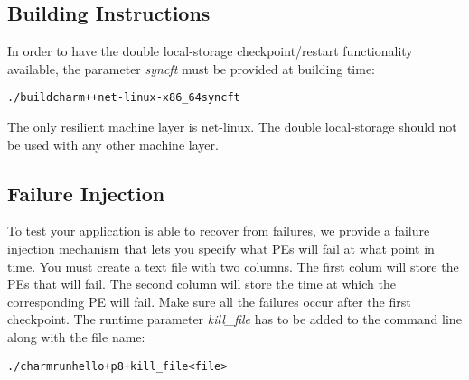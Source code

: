 \subsection{Building Instructions}
In order to have the double local-storage checkpoint/restart functionality available, the parameter \emph{syncft} must be provided at building time:

\begin{alltt}
   ./build charm++ net-linux-x86_64 syncft
\end{alltt} 
The only resilient machine layer is net-linux. The double local-storage should not be used with any other machine layer.

\subsection{Failure Injection}
To test your application is able to recover from failures, we provide a failure injection mechanism that lets you specify what PEs will fail at what point in time. You must create a text file with two columns. The first colum will store the PEs that will fail. The second column will store the time at which the corresponding PE will fail. Make sure all the failures occur after the first checkpoint. The runtime parameter \emph{kill\_file} has to be added to the command line along with the file name:

\begin{alltt}
   ./charmrun hello +p8 +kill_file <file>
\end{alltt} 

